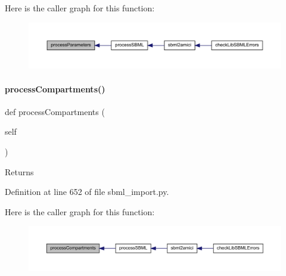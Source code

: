 Here is the caller graph for this function\+:
\nopagebreak
\begin{figure}[H]
\begin{center}
\leavevmode
\includegraphics[width=350pt]{classamici_1_1sbml__import_1_1_sbml_importer_a26d072114efe1fec695cc4030c64e1ea_icgraph}
\end{center}
\end{figure}
\mbox{\label{classamici_1_1sbml__import_1_1_sbml_importer_a526afc71a857e7fdefb4754fc2f93882}} 
\paragraph{\texorpdfstring{process\+Compartments()}{processCompartments()}}
{\footnotesize\ttfamily def process\+Compartments (\begin{DoxyParamCaption}\item[{}]{self }\end{DoxyParamCaption})}

\begin{DoxyReturn}{Returns}

\end{DoxyReturn}


Definition at line 652 of file sbml\+\_\+import.\+py.

Here is the caller graph for this function\+:
\nopagebreak
\begin{figure}[H]
\begin{center}
\leavevmode
\includegraphics[width=350pt]{classamici_1_1sbml__import_1_1_sbml_importer_a526afc71a857e7fdefb4754fc2f93882_icgraph}
\end{center}
\end{figure}
\mbox{\label{classamici_1_1sbml__import_1_1_sbml_importer_adbdd8e9af99679633109829d94b3fd3e}} 
